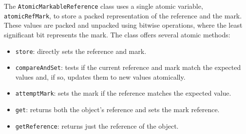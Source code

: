 The \texttt{AtomicMarkableReference} class uses a single atomic variable, \texttt{atomicRefMark}, to store a packed representation of the reference and the mark.
These values are packed and unpacked using bitwise operations, where the least significant bit represents the mark.
The class offers several atomic methods:

\begin{itemize} 
    \item \texttt{store}: directly sets the reference and mark.
    \item \texttt{compareAndSet}: tests if the current reference and mark match the expected values and, if so, updates them to new values atomically. 
    \item \texttt{attemptMark}: sets the mark if the reference matches the expected value.
    \item \texttt{get}: returns both the object's reference and sets the mark reference. 
    \item \texttt{getReference}: returns just the reference of the object.
\end{itemize}

\vspace{15pt}
    
